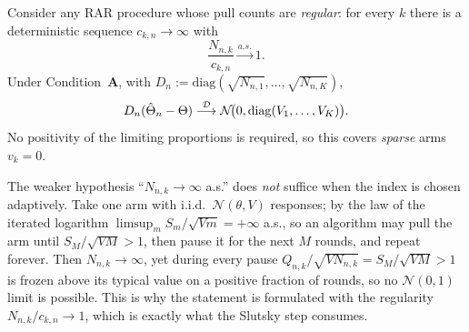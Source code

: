 \begin{lemma}\label{lem:componentwise}
\leanok
{}
Consider any RAR procedure whose pull counts are \emph{regular}: for every $k$ there is a
deterministic sequence $c_{k,n}\to\infty$ with
\[
  \frac{N_{n,k}}{c_{k,n}}\xrightarrow{a.s.}1 .
\]
Under Condition~\textbf{A}, with $D_n := \mathrm{diag}(\sqrt{N_{n,1}},\dots,\sqrt{N_{n,K}})$,
\[
  D_n(\hat{\Theta}_n - \Theta) \overset{\mathcal{D}}{\longrightarrow} \mathcal{N}\!\big(0, \mathrm{diag}(V_1,\dots,V_K)\big).
\]
No positivity of the limiting proportions is required, so this covers \emph{sparse} arms $v_k=0$.
\end{lemma}

\begin{remark}\label{rem:componentwise_regularity}
The weaker hypothesis ``$N_{n,k}\to\infty$ a.s.'' does \emph{not} suffice when the index is chosen
adaptively. Take one arm with i.i.d.\ $\mathcal N(\theta,V)$ responses; by the law of the iterated
logarithm $\limsup_m S_m/\sqrt{Vm}=+\infty$ a.s., so an algorithm may pull the arm until
$S_M/\sqrt{VM}>1$, then pause it for the next $M$ rounds, and repeat forever. Then
$N_{n,k}\to\infty$, yet during every pause $Q_{n,k}/\sqrt{V N_{n,k}}=S_M/\sqrt{VM}>1$ is frozen
above its typical value on a positive fraction of rounds, so no $\mathcal N(0,1)$ limit is possible.
This is why the statement is formulated with the regularity $N_{n,k}/c_{k,n}\to1$, which is exactly
what the Slutsky step consumes.
\end{remark}

